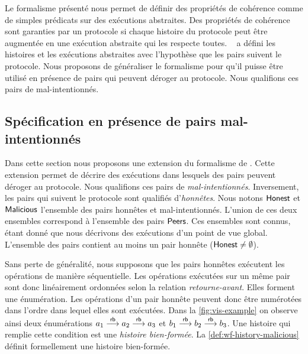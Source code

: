 Le formalisme présenté nous permet de définir des propriétés de cohérence comme de simples prédicats sur des exécutions abstraites.
Des propriétés de cohérence sont garanties par un protocole si chaque histoire du protocole peut être augmentée en une exécution abstraite qui les respecte toutes.
~\textcite{burckhardt_eventualconsistency_2014} a défini les histoires et les exécutions abstraites avec l'hypothèse que les pairs  suivent le protocole.
Nous proposons de généraliser le formalisme pour qu'il puisse être utilisé en présence de pairs qui peuvent déroger au protocole.
Nous qualifions ces pairs de mal-intentionnés.


\subsection{Spécification en présence de pairs mal-intentionnés}\label{subsec:consistency-spec-malicious}

%

Dans cette section nous proposons une extension du formalisme de \textcite{burckhardt_eventualconsistency_2014}.
Cette extension permet de décrire des exécutions dans lesquels des pairs peuvent déroger au protocole.
Nous qualifions ces pairs de \emph{mal-intentionnés}.
Inversement, les pairs qui suivent le protocole sont qualifiés d'\emph{honnêtes}.
Nous notons $\operatorname{\mathsf{Honest}}$ et $\operatorname{\mathsf{Malicious}}$ l'ensemble des pairs honnêtes et mal-intentionnés.
L'union de ces deux ensembles correspond à l'ensemble des pairs $\operatorname{\mathsf{Peers}}$.
Ces ensembles sont connus, étant donné que nous décrivons des exécutions d'un point de vue global.
L'ensemble des pairs contient au moins un pair honnête ($\operatorname{\mathsf{Honest}} \neq \emptyset$).

Sans perte de généralité, nous supposons que les pairs honnêtes exécutent les opérations de manière séquentielle.
Les opérations exécutées sur un même pair sont donc linéairement ordonnées selon la relation \emph{retourne-avant}.
Elles forment une énumération.
Les opérations d'un pair honnête peuvent donc être numérotées dans l'ordre dans lequel elles sont exécutées.
Dans la \autoref{fig:vis-example} on observe ainsi deux énumérations $a_1 \overset{\mathsf{rb}}{\longrightarrow} a_2 \overset{\mathsf{rb}}{\longrightarrow} a_3$ et $b_1 \overset{\mathsf{rb}}{\longrightarrow} b_2 \overset{\mathsf{rb}}{\longrightarrow} b_3$.
Une histoire qui remplie cette condition est une \emph{histoire bien-formée}.
La \autoref{def:wf-history-malicious} définit formellement une histoire bien-formée.

